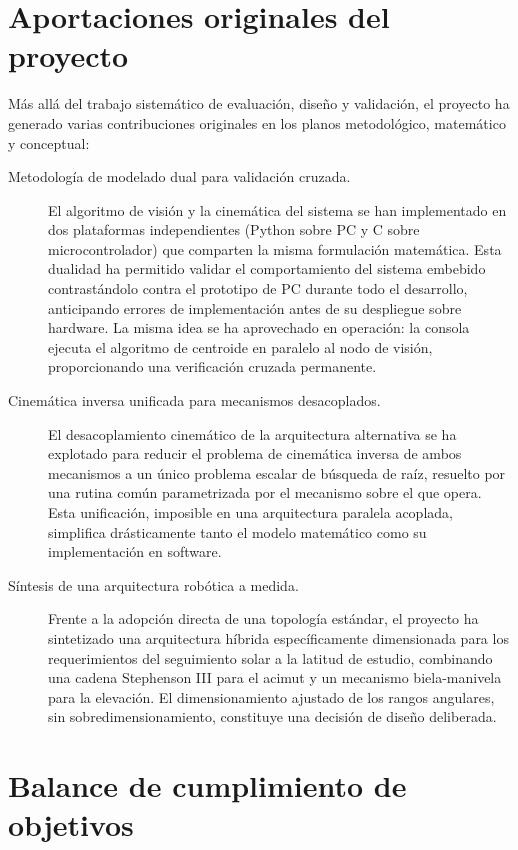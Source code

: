 \section{Aportaciones originales del proyecto}
\label{sec:aportaciones}
Más allá del trabajo sistemático de evaluación, diseño y validación, el proyecto ha generado varias contribuciones originales en los planos metodológico, matemático y conceptual:

\begin{description}
\item[Metodología de modelado dual para validación cruzada.] El algoritmo de visión y la cinemática del sistema se han implementado en dos plataformas independientes (Python sobre PC y C sobre microcontrolador) que comparten la misma formulación matemática. Esta dualidad ha permitido validar el comportamiento del sistema embebido contrastándolo contra el prototipo de PC durante todo el desarrollo, anticipando errores de implementación antes de su despliegue sobre hardware. La misma idea se ha aprovechado en operación: la consola ejecuta el algoritmo de centroide en paralelo al nodo de visión, proporcionando una verificación cruzada permanente.

\item[Cinemática inversa unificada para mecanismos desacoplados.] El desacoplamiento cinemático de la arquitectura alternativa se ha explotado para reducir el problema de cinemática inversa de ambos mecanismos a un único problema escalar de búsqueda de raíz, resuelto por una rutina común parametrizada por el mecanismo sobre el que opera. Esta unificación, imposible en una arquitectura paralela acoplada, simplifica drásticamente tanto el modelo matemático como su implementación en software.

\item[Síntesis de una arquitectura robótica a medida.] Frente a la adopción directa de una topología estándar, el proyecto ha sintetizado una arquitectura híbrida específicamente dimensionada para los requerimientos del seguimiento solar a la latitud de estudio, combinando una cadena Stephenson III para el acimut y un mecanismo biela-manivela para la elevación. El dimensionamiento ajustado de los rangos angulares, sin sobredimensionamiento, constituye una decisión de diseño deliberada.

\end{description}

\section{Balance de cumplimiento de objetivos}
\label{sec:balance_objetivos}

